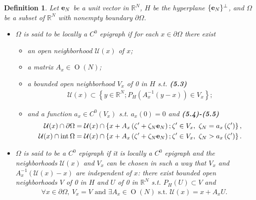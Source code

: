 \documentclass{book}
\numberwithin{equation}{section}
\newtheorem{definition}{Definition}[section]
\begin{document}
\begin{enumerate}
    \begin{definition}
        Let ${\bf e}_N$ be a unit vector in $\mathbb{R}^N$, $H$ be the hyperplane $\{{\bf e}_N\}^\bot$, and $\Omega$ be a subset of $\mathbb{R}^N$ with nonempty boundary $\partial\Omega$.
        \begin{itemize}
            \item[(i)] $\Omega$ is said to be \emph{locally a $C^0$ epigraph} if for each $x\in\partial\Omega$ there exist
            \begin{itemize}
                \item[(a)] an open neighborhood $\mathcal{U}(x)$ of $x$;
                \item[(b)] a matrix $A_x\in\operatorname{O}(N)$;
                \item[(c)] a bounded open neighborhood $V_x$ of 0 in $H$ s.t. \textbf{(5.3)}
                \begin{align*}
                    \mathcal{U}(x)\subset\left\{y\in\mathbb{R}^N;P_H\left(A_x^{-1}\left(y - x\right)\right)\in V_x\right\};
                \end{align*}
                \item[(d)] and a function $a_x\in C^0(V_x)$ s.t. $a_x(0) = 0$ and \textbf{(5.4)-(5.5)}
                \begin{align*}
                    \mathcal{U}(x)\cap\partial\Omega &= \mathcal{U}(x)\cap\left\{x + A_x\left(\zeta' + \zeta_N{\bf e}_N\right);\zeta'\in V_x,\ \zeta_N = a_x\left(\zeta'\right)\right\},\\
                    \mathcal{U}(x)\cap{\rm int}\,\Omega &= \mathcal{U}(x)\cap\left\{x + A_x\left(\zeta' + \zeta_N{\bf e}_N\right);\zeta'\in V_x,\ \zeta_N > a_x\left(\zeta'\right)\right\}.
                \end{align*}
            \end{itemize}
            \item[(ii)] $\Omega$ is said to be a \emph{$C^0$ epigraph} if it is locally a $C^0$ epigraph and the neighborhoods $\mathcal{U}(x)$ and $V_x$ can be chosen in such a way that $V_x$ and $A_x^{-1}\left(\mathcal{U}(x) - x\right)$ are independent of $x$: there exist bounded open neighborhoods $V$ of 0 in $H$ and $U$ of 0 in $\mathbb{R}^N$ s.t. $P_H(U)\subset V$ and
            \begin{align*}
                \forall x\in\partial\Omega,\ V_x = V \mbox{ and } \exists A_x\in\operatorname{O}(N) \mbox{ s.t. } \mathcal{U}(x) = x + A_xU.
            \end{align*}

\end{itemize}
\end{definition}
\end{enumerate}
\end{document}
